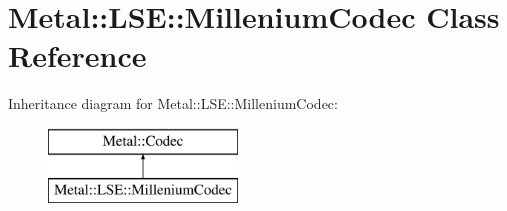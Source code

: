 \hypertarget{classMetal_1_1LSE_1_1MilleniumCodec}{}\section{Metal\+:\+:L\+S\+E\+:\+:Millenium\+Codec Class Reference}
\label{classMetal_1_1LSE_1_1MilleniumCodec}
Inheritance diagram for Metal\+:\+:L\+S\+E\+:\+:Millenium\+Codec\+:\begin{figure}[H]
\begin{center}
\leavevmode
\includegraphics[height=2.000000cm]{classMetal_1_1LSE_1_1MilleniumCodec}
\end{center}
\end{figure}
